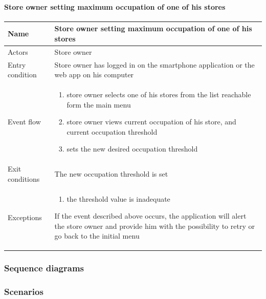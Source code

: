 \paragraph{Store owner setting maximum occupation of one of his stores}
\begin{flushleft}
	\begin{tabular} { | m{3cm} | m{10cm} | }
		\hline
		Name & Store owner setting maximum occupation of one of his stores\\
		\hline
		Actors & Store owner\\
		\hline
		Entry condition & Store owner has logged in on the smartphone application or the web app on his computer\\
		\hline
		Event flow & \begin{enumerate}
			\item store owner selects one of his stores from the list reachable form the main menu
			\item store owner views current occupation of his store, and current occupation threshold
			\item sets the new desired occupation threshold
		\end{enumerate}\\
		\hline
		Exit conditions & The new occupation threshold is set\\
		\hline
		Exceptions & \begin{enumerate}
			\item the threshold value is inadequate
		\end{enumerate}
		If the event described above occurs, the application will alert the store owner and provide him with the possibility to retry or go back to the initial menu\\
		\hline
	\end{tabular}
\end{flushleft}
\subsubsection{Sequence diagrams}
\subsubsection{Scenarios} %
